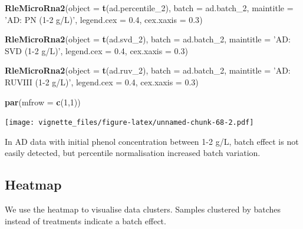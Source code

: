 \documentclass[]{book}
\newenvironment{Shaded}{\begin{snugshade}}{\end{snugshade}}
\newcommand{\KeywordTok}[1]{\textcolor[rgb]{0.13,0.29,0.53}{\textbf{#1}}}
\newcommand{\DataTypeTok}[1]{\textcolor[rgb]{0.13,0.29,0.53}{#1}}
\newcommand{\DecValTok}[1]{\textcolor[rgb]{0.00,0.00,0.81}{#1}}
\newcommand{\FloatTok}[1]{\textcolor[rgb]{0.00,0.00,0.81}{#1}}
\newcommand{\StringTok}[1]{\textcolor[rgb]{0.31,0.60,0.02}{#1}}
\newcommand{\NormalTok}[1]{#1}
\begin{document}
\begin{Shaded}
\begin{Highlighting}[]
\KeywordTok{RleMicroRna2}\NormalTok{(}\DataTypeTok{object =} \KeywordTok{t}\NormalTok{(ad.percentile_}\DecValTok{2}\NormalTok{), }\DataTypeTok{batch =}\NormalTok{ ad.batch_}\DecValTok{2}\NormalTok{, }
             \DataTypeTok{maintitle =} \StringTok{'AD: PN (1-2 g/L)'}\NormalTok{, }\DataTypeTok{legend.cex =} \FloatTok{0.4}\NormalTok{, }
             \DataTypeTok{cex.xaxis =} \FloatTok{0.3}\NormalTok{)}

\KeywordTok{RleMicroRna2}\NormalTok{(}\DataTypeTok{object =} \KeywordTok{t}\NormalTok{(ad.svd_}\DecValTok{2}\NormalTok{), }\DataTypeTok{batch =}\NormalTok{ ad.batch_}\DecValTok{2}\NormalTok{, }
             \DataTypeTok{maintitle =} \StringTok{'AD: SVD (1-2 g/L)'}\NormalTok{, }\DataTypeTok{legend.cex =} \FloatTok{0.4}\NormalTok{, }
             \DataTypeTok{cex.xaxis =} \FloatTok{0.3}\NormalTok{)}

\KeywordTok{RleMicroRna2}\NormalTok{(}\DataTypeTok{object =} \KeywordTok{t}\NormalTok{(ad.ruv_}\DecValTok{2}\NormalTok{), }\DataTypeTok{batch =}\NormalTok{ ad.batch_}\DecValTok{2}\NormalTok{, }
             \DataTypeTok{maintitle =} \StringTok{'AD: RUVIII (1-2 g/L)'}\NormalTok{, }\DataTypeTok{legend.cex =} \FloatTok{0.4}\NormalTok{, }
             \DataTypeTok{cex.xaxis =} \FloatTok{0.3}\NormalTok{)}

\KeywordTok{par}\NormalTok{(}\DataTypeTok{mfrow =} \KeywordTok{c}\NormalTok{(}\DecValTok{1}\NormalTok{,}\DecValTok{1}\NormalTok{))}
\end{Highlighting}
\end{Shaded}

\texttt{[image: vignette\_files/figure-latex/unnamed-chunk-68-2.pdf]}

In AD data with initial phenol concentration between 1-2 g/L, batch
effect is not easily detected, but percentile normalisation increased
batch variation.

\subsection{Heatmap}\label{heatmap-1}

We use the heatmap to visualise data clusters. Samples clustered by
batches instead of treatments indicate a batch effect.
\end{document}
